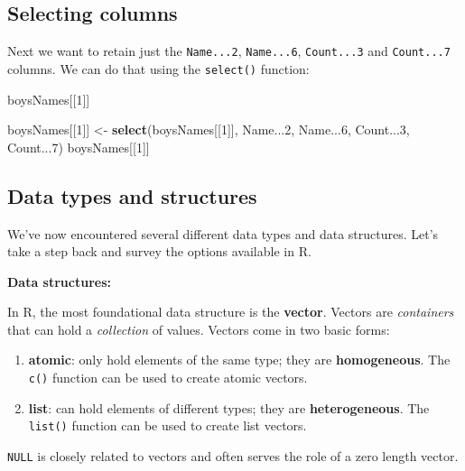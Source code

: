 \documentclass[]{book}
\newenvironment{Shaded}{\begin{snugshade}}{\end{snugshade}}
\newcommand{\KeywordTok}[1]{\textcolor[rgb]{0.13,0.29,0.53}{\textbf{#1}}}
\newcommand{\DecValTok}[1]{\textcolor[rgb]{0.00,0.00,0.81}{#1}}
\newcommand{\StringTok}[1]{\textcolor[rgb]{0.31,0.60,0.02}{#1}}
\newcommand{\NormalTok}[1]{#1}
\providecommand{\tightlist}{%
  \setlength{\itemsep}{0pt}\setlength{\parskip}{0pt}}
\begin{document}
\subsection{Selecting columns}\label{selecting-columns}

Next we want to retain just the \texttt{Name...2}, \texttt{Name...6},
\texttt{Count...3} and \texttt{Count...7} columns. We can do that using
the \texttt{select()} function:

\begin{Shaded}
\begin{Highlighting}[]
\NormalTok{boysNames[[}\DecValTok{1}\NormalTok{]]}

\NormalTok{boysNames[[}\DecValTok{1}\NormalTok{]] <-}\StringTok{ }\KeywordTok{select}\NormalTok{(boysNames[[}\DecValTok{1}\NormalTok{]], Name...}\DecValTok{2}\NormalTok{, Name...}\DecValTok{6}\NormalTok{, Count...}\DecValTok{3}\NormalTok{, Count...}\DecValTok{7}\NormalTok{)}
\NormalTok{boysNames[[}\DecValTok{1}\NormalTok{]]}
\end{Highlighting}
\end{Shaded}

\subsection{Data types and structures}\label{data-types-and-structures}

We've now encountered several different data types and data structures.
Let's take a step back and survey the options available in R.

\textbf{Data structures:}

In R, the most foundational data structure is the \textbf{vector}.
Vectors are \emph{containers} that can hold a \emph{collection} of
values. Vectors come in two basic forms:

\begin{enumerate}
\def\labelenumi{\arabic{enumi}.}
\tightlist
\item
  \textbf{atomic}: only hold elements of the same type; they are
  \textbf{homogeneous}. The \texttt{c()} function can be used to create
  atomic vectors.
\item
  \textbf{list}: can hold elements of different types; they are
  \textbf{heterogeneous}. The \texttt{list()} function can be used to
  create list vectors.
\end{enumerate}

\texttt{NULL} is closely related to vectors and often serves the role of
a zero length vector.
\end{document}
